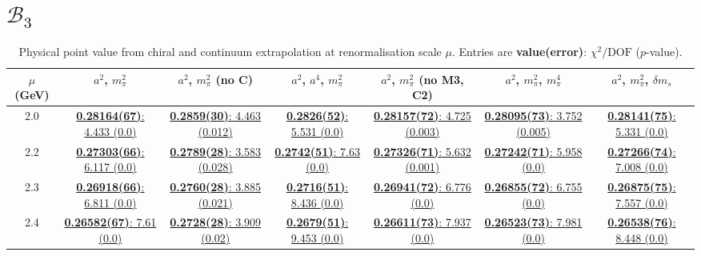 \documentclass[12pt]{extarticle}
\begin{document}
\section{$\mathcal{B}_3$}
\begin{table}[h!]
\begin{center}
\begin{tabular}{|c|c|c|c|c|c|c|}
\hline
$\mu$ (GeV) & $a^2$, $m_\pi^2$& $a^2$, $m_\pi^2$ (no C)& $a^2$, $a^4$, $m_\pi^2$& $a^2$, $m_\pi^2$ (no M3, C2)& $a^2$, $m_\pi^2$, $m_\pi^4$& $a^2$, $m_\pi^2$, $\delta m_s$\\
\hline
2.0& \hyperlink{SSmPP/SUSY/a2m2_20.pdf.1}{\textbf{0.28164(67)}: 4.433 (0.0)} & \hyperlink{SSmPP/SUSY/a2m2noC_20.pdf.1}{\textbf{0.2859(30)}: 4.463 (0.012)} & \hyperlink{SSmPP/SUSY/a2a4m2_20.pdf.1}{\textbf{0.2826(52)}: 5.531 (0.0)} & \hyperlink{SSmPP/SUSY/a2m2mcut_20.pdf.1}{\textbf{0.28157(72)}: 4.725 (0.003)} & \hyperlink{SSmPP/SUSY/a2m2m4_20.pdf.1}{\textbf{0.28095(73)}: 3.752 (0.005)} & \hyperlink{SSmPP/SUSY/a2m2delm_20.pdf.1}{\textbf{0.28141(75)}: 5.331 (0.0)}\\
2.2& \hyperlink{SSmPP/SUSY/a2m2_22.pdf.1}{\textbf{0.27303(66)}: 6.117 (0.0)} & \hyperlink{SSmPP/SUSY/a2m2noC_22.pdf.1}{\textbf{0.2789(28)}: 3.583 (0.028)} & \hyperlink{SSmPP/SUSY/a2a4m2_22.pdf.1}{\textbf{0.2742(51)}: 7.63 (0.0)} & \hyperlink{SSmPP/SUSY/a2m2mcut_22.pdf.1}{\textbf{0.27326(71)}: 5.632 (0.001)} & \hyperlink{SSmPP/SUSY/a2m2m4_22.pdf.1}{\textbf{0.27242(71)}: 5.958 (0.0)} & \hyperlink{SSmPP/SUSY/a2m2delm_22.pdf.1}{\textbf{0.27266(74)}: 7.008 (0.0)}\\
2.3& \hyperlink{SSmPP/SUSY/a2m2_23.pdf.1}{\textbf{0.26918(66)}: 6.811 (0.0)} & \hyperlink{SSmPP/SUSY/a2m2noC_23.pdf.1}{\textbf{0.2760(28)}: 3.885 (0.021)} & \hyperlink{SSmPP/SUSY/a2a4m2_23.pdf.1}{\textbf{0.2716(51)}: 8.436 (0.0)} & \hyperlink{SSmPP/SUSY/a2m2mcut_23.pdf.1}{\textbf{0.26941(72)}: 6.776 (0.0)} & \hyperlink{SSmPP/SUSY/a2m2m4_23.pdf.1}{\textbf{0.26855(72)}: 6.755 (0.0)} & \hyperlink{SSmPP/SUSY/a2m2delm_23.pdf.1}{\textbf{0.26875(75)}: 7.557 (0.0)}\\
2.4& \hyperlink{SSmPP/SUSY/a2m2_24.pdf.1}{\textbf{0.26582(67)}: 7.61 (0.0)} & \hyperlink{SSmPP/SUSY/a2m2noC_24.pdf.1}{\textbf{0.2728(28)}: 3.909 (0.02)} & \hyperlink{SSmPP/SUSY/a2a4m2_24.pdf.1}{\textbf{0.2679(51)}: 9.453 (0.0)} & \hyperlink{SSmPP/SUSY/a2m2mcut_24.pdf.1}{\textbf{0.26611(73)}: 7.937 (0.0)} & \hyperlink{SSmPP/SUSY/a2m2m4_24.pdf.1}{\textbf{0.26523(73)}: 7.981 (0.0)} & \hyperlink{SSmPP/SUSY/a2m2delm_24.pdf.1}{\textbf{0.26538(76)}: 8.448 (0.0)}\\
\hline
\end{tabular}
\caption{Physical point value from chiral and continuum extrapolation at renormalisation scale $\mu$. Entries are \textbf{value(error)}: $\chi^2/\text{DOF}$ ($p$-value).}
\end{center}
\end{table}
\end{document}
